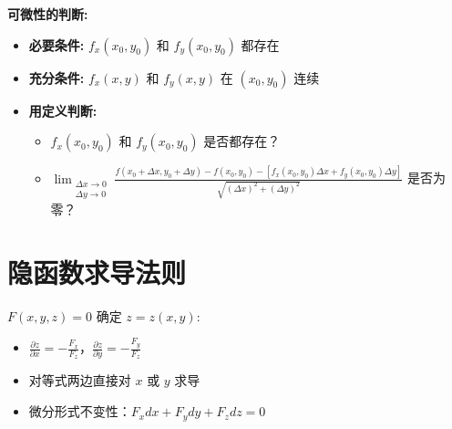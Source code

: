 \documentclass[10pt]{article}
\begin{document}
\begin{multicols*}{2}
\textbf{可微性的判断:}
\begin{itemize}
  \item \textbf{必要条件:} \(f_x(x_0,y_0)\) 和 \(f_y(x_0,y_0)\) 都存在
  \item \textbf{充分条件:} \(f_x(x,y)\) 和 \(f_y(x,y)\) 在 \((x_0,y_0)\) 连续
  \item \textbf{用定义判断:}
    \begin{itemize}
      \item \(f_x(x_0,y_0)\) 和 \(f_y(x_0,y_0)\) 是否都存在？
      \item \(\lim_{\substack{\Delta x \to 0 \\ \Delta y \to 0}} \frac{f(x_0 + \Delta x,y_0 + \Delta y) - f(x_0,y_0) - [f_x(x_0,y_0)\Delta x + f_y(x_0,y_0)\Delta y]}{\sqrt{(\Delta x)^2 + (\Delta y)^2}}\) 是否为零？
    \end{itemize}
\end{itemize}

\section*{隐函数求导法则}

\(F(x,y,z) = 0\) 确定 \(z = z(x,y)\):
\begin{itemize}
  \item \(\frac{\partial z}{\partial x} = -\frac{F_x}{F_z}\)，\(\frac{\partial z}{\partial y} = -\frac{F_y}{F_z}\)
  \item 对等式两边直接对 \(x\) 或 \(y\) 求导
  \item 微分形式不变性：\(F_x dx + F_y dy + F_z dz = 0\)
\end{itemize}

\end{multicols*}
\end{document}
